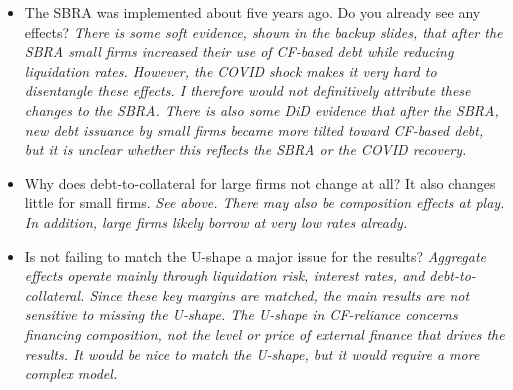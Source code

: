 \documentclass[12pt]{article}
\begin{document}
\begin{itemize}
    \textit{This is something I plan to do later. I am fairly confident it would not change the overall message. There is a break in some variables around 2020, but long-run averages are not strongly affected.}
    \item The SBRA was implemented about five years ago. Do you already see any effects? 
    \textit{There is some soft evidence, shown in the backup slides, that after the SBRA small firms increased their use of CF-based debt while reducing liquidation rates. However, the COVID shock makes it very hard to disentangle these effects. I therefore would not definitively attribute these changes to the SBRA. There is also some DiD evidence that after the SBRA, new debt issuance by small firms became more tilted toward CF-based debt, but it is unclear whether this reflects the SBRA or the COVID recovery.}
    \item Why does debt-to-collateral for large firms not change at all? It also changes little for small firms. 
    \textit{See above. There may also be composition effects at play. In addition, large firms likely borrow at very low rates already.}
    \item Is not failing to match the U-shape a major issue for the results?    
    \textit{Aggregate effects operate mainly through liquidation risk, interest rates, and debt-to-collateral.  Since these key margins are matched, the main results are not sensitive to missing the U-shape. The U-shape in CF-reliance concerns financing composition, not the level or price of external finance that drives the results. It would be nice to match the U-shape, but it would require a more complex model.}

\end{itemize}
\end{document}
